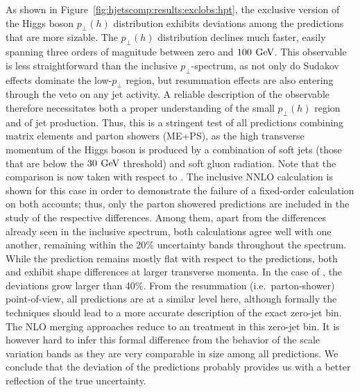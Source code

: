 As shown in Figure~\ref{fig:hjetscomp:results:exclobs:hpt}, the
exclusive version of  the Higgs boson $p_\perp(h)$ distribution exhibits deviations among the
predictions that are more sizable. The $p_\perp(h)$ distribution 
declines much faster, easily spanning three orders of magnitude 
between zero and $100\,\text{\:GeV}$. This observable is less straightforward 
than the inclusive $p_\perp$-spectrum, as not only do Sudakov effects 
dominate the low-$p_\perp$ region, but resummation effects are also 
entering through the veto on any jet activity. A reliable description
of the observable therefore necessitates both a proper understanding
of the small $p_\perp(h)$ region and of jet production. Thus,
this is a stringent test of all predictions combining matrix elements
and parton showers (ME+PS), as
the high transverse momentum of the Higgs boson is produced by a
combination of soft jets (those that are below the $30\,\text{\:GeV}$ threshold)
and soft gluon radiation. Note that the comparison is now taken with respect to
\hjetscompPowheg \hjetscompNNLOPS. The inclusive 
NNLO calculation is shown for this case in order  to demonstrate the failure of a fixed-order 
calculation on both accounts; thus, only the parton showered 
predictions are included in the study of the respective differences. 
Among them, apart from the differences already seen in the inclusive 
spectrum, both \hjetscompNNLOPS calculations agree  well with one another, 
remaining within the 20\% uncertainty bands throughout the spectrum. 
While the \hjetscompSherpa \hjetscompMEPSatNLO prediction remains mostly flat with respect to the \hjetscompNNLOPS 
predictions, both \hjetscompMGaMC and \hjetscompHerwig exhibit shape differences  at
larger transverse momenta. In the case of \hjetscompHerwig, the deviations  grow
larger than 40\%. From the resummation (i.e.~parton-shower)
point-of-view, all predictions are at a similar level here, although
formally the \hjetscompNNLOPS techniques should lead to a more accurate description of
the exact zero-jet bin. The NLO merging approaches reduce to an \hjetscompNLOPS
treatment in this zero-jet bin. It is however hard to infer this
formal difference from the behavior of the scale variation bands as
they are very comparable in size among all predictions. We conclude
that the deviation of the predictions probably provides us with a
better reflection of the true uncertainty.

